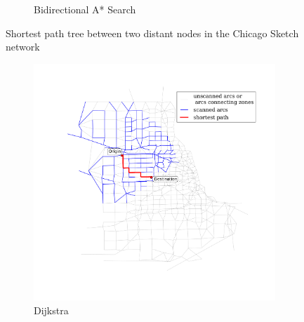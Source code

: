\begin{figure}[H]
\begin{subfigure}{.5\textwidth}
        \caption{Bidirectional A* Search}
        \label{fig:chicago_astar_bidirect}
    \end{subfigure}
    \vspace{1em}
    \caption{Shortest path tree between two distant nodes in the Chicago Sketch network}
    \label{fig:long_sptree}
\end{figure}

\begin{figure}[H]
    \centering
    \begin{subfigure}{.5\textwidth}
        \centering
        \includegraphics[width=\textwidth,trim=120px 120px 48px 120px,clip]{img/chicago_dijkstra2}
        \caption{Dijkstra}
        \label{fig:chicago_dijkstra2}
    \end{subfigure}%
    \begin{subfigure}{.5\textwidth}
        \centering

\end{subfigure}
\end{figure}
